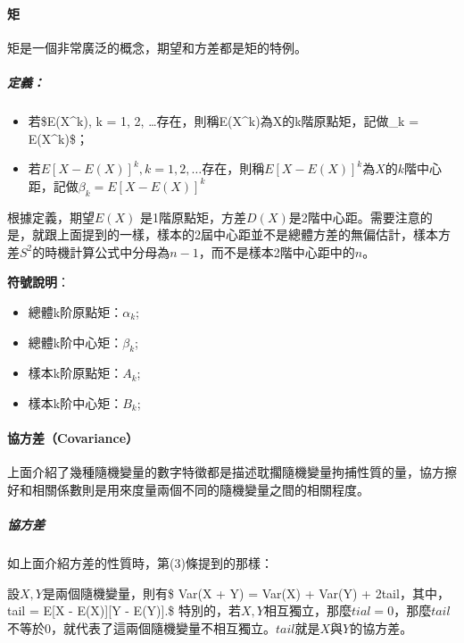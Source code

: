 \documentclass[11pt]{article}
\providecommand{\tightlist}{%
      \setlength{\itemsep}{0pt}\setlength{\parskip}{0pt}}
\begin{document}
    \hypertarget{ux77e9}{%
\paragraph{矩}\label{ux77e9}}

矩是一個非常廣泛的概念，期望和方差都是矩的特例。

\hypertarget{ux5b9aux7fa9}{%
\subparagraph{定義：}\label{ux5b9aux7fa9}}

\begin{itemize}
\tightlist
\item
  若\$E(X\^{}k), k = 1, 2,
  \dots \(存在，則稱\)E(X\^{}k)\(為\)X\(的\)k\(階原點矩，記做\)\alpha\_k
  = E(X\^{}k)\$；
\item
  若\(E[X - E(X)]^k, k = 1, 2, \dots\)存在，則稱\(E[X-E(X)]^k\)為\(X\)的\(k\)階中心距，記做\(\beta_k = E[X-E(X)]^k\)
\end{itemize}

根據定義，期望\(E(X)\)
是1階原點矩，方差\(D(X)\)是2階中心距。需要注意的是，就跟上面提到的一樣，樣本的2屆中心距並不是總體方差的無偏估計，樣本方差\(S^2\)的時機計算公式中分母為\(n-1\)，而不是樣本2階中心距中的\(n\)。

\textbf{符號說明}：

\begin{itemize}
\tightlist
\item
  總體k阶原點矩：\(α_k\);
\item
  總體k阶中心矩：\(β_k\);
\item
  樣本k阶原點矩：\(A_k\);
\item
  樣本k阶中心矩：\(B_k\);
\end{itemize}

    \hypertarget{ux5354ux65b9ux5deecovariance}{%
\paragraph{協方差（Covariance）}\label{ux5354ux65b9ux5deecovariance}}

上面介紹了幾種隨機變量的數字特徵都是描述耽擱隨機變量拘捕性質的量，協方擦好和相關係數則是用來度量兩個不同的隨機變量之間的相關程度。

\hypertarget{ux5354ux65b9ux5dee}{%
\subparagraph{協方差}\label{ux5354ux65b9ux5dee}}

如上面介紹方差的性質時，第(3)條提到的那樣：

設\(X, Y\)是兩個隨機變量，則有\$ Var(X + Y) = Var(X) + Var(Y) +
2\cdot tail\(，其中，\)tail = E{[}X - E(X){]}{[}Y - E(Y){]}.\$
特別的，若\(X, Y\)相互獨立，那麼\(tial = 0\)，那麼\(tail\)不等於\(0\)，就代表了這兩個隨機變量不相互獨立。\(tail\)就是\(X\)與\(Y\)的協方差。
\end{document}
